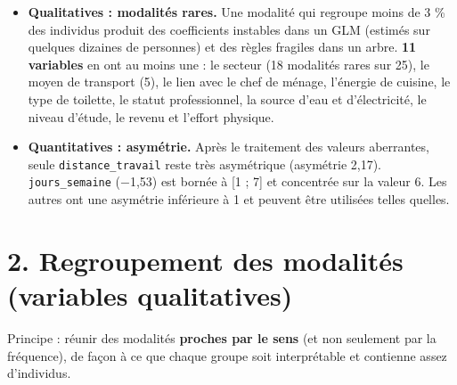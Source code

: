\documentclass[

  french,

  10pt,

  a4paper,

]{article}
\providecommand{\tightlist}{%

  \setlength{\itemsep}{0pt}\setlength{\parskip}{0pt}}
\begin{document}
\begin{itemize}

\tightlist

\item

  \textbf{Qualitatives : modalités rares.} Une modalité qui regroupe moins de 3 \% des individus produit des coefficients instables dans un GLM (estimés sur quelques dizaines de personnes) et des règles fragiles dans un arbre. \textbf{11 variables} en ont au moins une : le secteur (18 modalités rares sur 25), le moyen de transport (5), le lien avec le chef de ménage, l'énergie de cuisine, le type de toilette, le statut professionnel, la source d'eau et d'électricité, le niveau d'étude, le revenu et l'effort physique.

\item

  \textbf{Quantitatives : asymétrie.} Après le traitement des valeurs aberrantes, seule \texttt{distance\_travail} reste très asymétrique (asymétrie 2,17). \texttt{jours\_semaine} (\ensuremath{-}1,53) est bornée à {[}1 ; 7{]} et concentrée sur la valeur 6. Les autres ont une asymétrie inférieure à 1 et peuvent être utilisées telles quelles.

\end{itemize}



\section{2. Regroupement des modalités (variables qualitatives)}



Principe : réunir des modalités \textbf{proches par le sens} (et non seulement par la fréquence), de façon à ce que chaque groupe soit interprétable et contienne assez d'individus.
\end{document}
